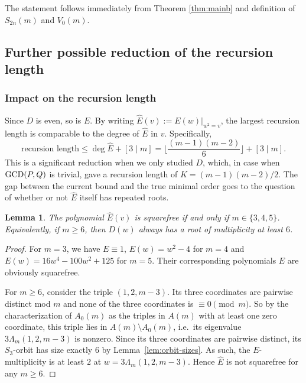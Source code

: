 \documentclass[11pt,reqno]{amsart}
\newtheorem{lemma}[theorem]{Lemma}
\theoremstyle{remark}
\begin{document}
The statement follows immediately from Theorem \ref{thm:mainb} and definition of $S_{2n}(m)$ and $V_0(m)$.

\subsection{Further possible reduction of the recursion length}

\subsubsection{Impact on the recursion length}

Since $D$ is even, so is $E$. By writing
$\widehat E(v):=E(w)|_{w^2=v}$, the largest recursion length is
comparable to the degree of $\widehat E$ in $v$.  Specifically,
\[
\text{recursion length} \le \deg\widehat E + [3\mid m] = \lfloor\frac{(m-1)(m-2)}{6} \rfloor+ [3\mid m].
\]
This is a significant reduction when we only studied $D$, which, in case when ${\rm GCD}(P,Q)$ is trivial, gave a recursion
length of $K=(m-1)(m-2)/2$.
The gap between the current bound and the true minimal order goes to the
question of whether or not $\widehat E$ itself has repeated roots.

\begin{lemma}
\label{thm:squarefree-char}
The polynomial
$\widehat E(v)$ is squarefree if and only if $m\in\{3,4,5\}$.
Equivalently, if $m\geq 6$, then $D(w)$ always has a root of multiplicity at least $6$.
\end{lemma}

\begin{proof} For $m=3$, we have $E\equiv 1$, $E(w)=w^2-4$ for $m=4$ and $E(w)=16w^4-100w^2+125$ for $m=5$. Their corresponding polynomials $\widehat{E}$ are obviously squarefree.

For $m\ge6$, consider the triple $(1,2,m-3)$. Its three coordinates are
pairwise distinct mod $m$ and none of the three coordinates is $\equiv0\pmod m$.
So by the characterization of $A_0(m)$ as
the triples in $A(m)$ with at least one zero coordinate,
this triple lies in $A(m)\setminus A_0(m)$, i.e.\ its eigenvalue
$3\Lambda_{m}(1,2,m-3)$ is nonzero. Since its three coordinates are
pairwise distinct, its $S_3$-orbit has size exactly $6$ by
Lemma~\ref{lem:orbit-sizes}.  As such, the $E$-multiplicity is at least $2$ at
$w=3\Lambda_{m}(1,2,m-3)$. Hence $\widehat E$ is
not squarefree for any $m\ge6$.
\end{proof}
\end{document}
